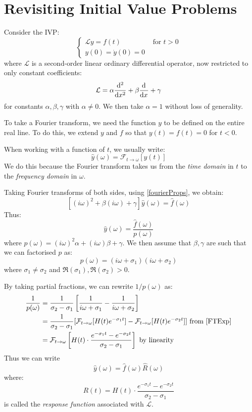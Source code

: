 \documentclass[../main.tex]{subfiles}
\begin{document}
\section{Revisiting Initial Value Problems}
Consider the IVP:
\[
  \begin{cases}
  \mathcal{L} y = f(t) & \text{ for } t > 0 \\
  y(0) = \dot{y}(0) = 0 &
  \end{cases}
\]
where $\mathcal{L}$ is a second-order linear ordinary differential operator, now restricted to only constant coefficients:
\[
  \mathcal{L} = \alpha \deriv[2]{}{x} + \beta \deriv{}{x} + \gamma
\]
for constants $\alpha, \beta, \gamma$ with $\alpha \neq 0$.
We then take $\alpha = 1$ without loss of generality.

To take a Fourier transform, we need the function $y$ to be defined on the entire real line.
To do this, we extend $y$ and $f$ so that $y(t) = f(t) = 0$ for $t < 0$.
\begin{remark}[Notation]
  When working with a function of $t$, we usually write:
  \[
    \hat{y}(\omega) = \mathcal{F}_{t \to \omega}[y(t)]
  \]
  We do this because the Fourier transform takes us from the \textit{time domain} in $t$ to the \textit{frequency domain} in $\omega$.
\end{remark}
Taking Fourier transforms of both sides, using \cref{fourierProps}, we obtain:
\[
  [(i\omega)^2 + \beta(i\omega) + \gamma] \hat{y}(\omega) = \hat{f}(\omega)
\]
Thus:
\[
  \hat{y}(\omega) = \frac{\hat{f}(\omega)}{p(\omega)}
\]
where $p(\omega) = (i\omega)^2 \alpha + (i\omega) \beta + \gamma$.
We then assume that $\beta, \gamma$ are such that we can factorised $p$ as:
\[
  p(\omega) = (i\omega + \sigma_1)(i\omega + \sigma_2)
\]
where $\sigma_1 \neq \sigma_2$ and $\Re(\sigma_1), \Re(\sigma_2) > 0$.

By taking partial fractions, we can rewrite $1/p(\omega)$ as:
\begin{align*}
  \frac{1}{p(\omega)} &= \frac{1}{\sigma_2 - \sigma_1}\left[\frac{1}{i\omega + \sigma_1} - \frac{1}{i\omega + \sigma_2}\right] \\
                      &= \frac{1}{\sigma_2 - \sigma_1}[\mathcal{F}_{t \to \omega}[H(t)e^{-\sigma_1 t}] - \mathcal{F}_{t \to \omega}[H(t)e^{-\sigma_2 t}]] \text{ from \cref{FTExp}} \\
                      &= \mathcal{F}_{t \to \omega}\left[H(t) \cdot \frac{e^{-\sigma_1 t} - e^{-\sigma_2 t}}{\sigma_2 - \sigma_1}\right] \text{ by linearity}
\end{align*}
Thus we can write
\[
  \hat{y}(\omega) = \hat{f}(\omega) \hat{R}(\omega)
\]
where:
\[
  R(t) = H(t) \cdot \frac{e^{-\sigma_1 t} - e^{-\sigma_2 t}}{\sigma_2 - \sigma_1}
\]
is called the \textit{response function} associated with $\mathcal{L}$.
\end{document}

